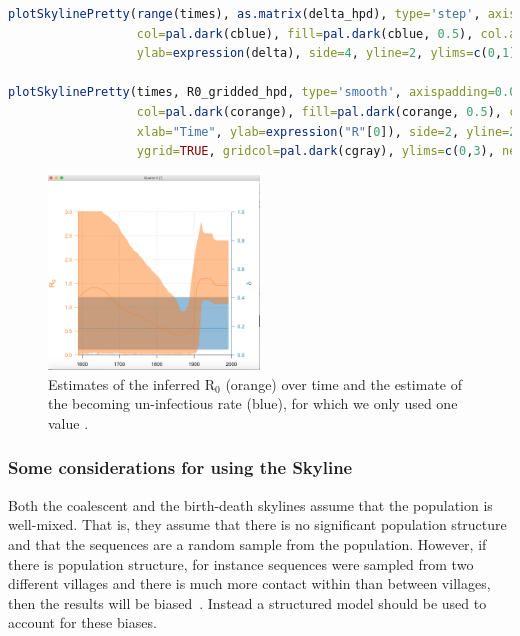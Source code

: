 \documentclass[11pt]{article}
\begin{document}
\begin{lstlisting}[language=R]
plotSkylinePretty(range(times), as.matrix(delta_hpd), type='step', axispadding=0.0, 
				  col=pal.dark(cblue), fill=pal.dark(cblue, 0.5), col.axis=pal.dark(cblue), 
				  ylab=expression(delta), side=4, yline=2, ylims=c(0,1), xaxis=FALSE) 

plotSkylinePretty(times, R0_gridded_hpd, type='smooth', axispadding=0.0, 
				  col=pal.dark(corange), fill=pal.dark(corange, 0.5), col.axis=pal.dark(corange), 
				  xlab="Time", ylab=expression("R"[0]), side=2, yline=2.5, xline=2, xgrid=TRUE, 
				  ygrid=TRUE, gridcol=pal.dark(cgray), ylims=c(0,3), new=TRUE, add=TRUE) 
\end{lstlisting}

\begin{figure}[h!]
\centering
\includegraphics[width=0.5\textwidth]{figures/bdsky_output.png}
\caption{\small Estimates of the inferred R$_{0}$ (orange) over time and the estimate of the becoming un-infectious rate (blue), for which we only used one value .}
\label{fig:bdsky_out}
\end{figure}


\subsubsection{Some considerations for using the Skyline}

Both the coalescent and the birth-death skylines assume that the population is well-mixed. That is, they assume that there is no significant population structure and that the sequences are a random sample from the population. However, if there is population structure, for instance sequences were sampled from two different villages and there is much more contact within than between villages, then the results will be biased~\citep{Heller2013}. Instead a structured model should be used to account for these biases.
\end{document}
